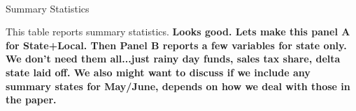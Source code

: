 

\begin{landscape}

\begin{table}[!ht]
\begin{center}
\begin{threeparttable}

\caption{\\ Summary Statistics}
\label{table:summarystats}

\centering 

\begin{small}

	

\end{small}

\begin{footnotesize}
\begin{tablenotes}
\item This table reports summary statistics. \textbf{Looks good. Lets make this panel A for State+Local. Then Panel B reports a few variables for state only. We don't need them all...just rainy day funds, sales tax share, delta state laid off. We also might want to discuss if we include any summary states for May/June, depends on how we deal with those in the paper.}
\end{tablenotes}
\end{footnotesize}
\end{threeparttable}
\end{center}
\end{table}
\end{landscape}


